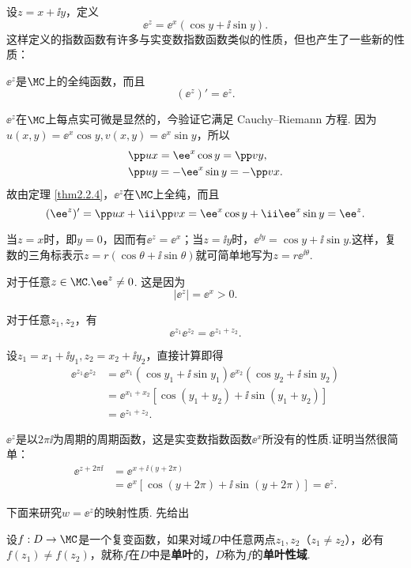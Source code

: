 设$z=x+\ii y$，定义
\[\ee^z=\ee^x(\cos y+\ii \sin y).\]
这样定义的指数函数有许多与实变数指数函数类似的性质，但也产生了一些新的性质：
\begin{eenum}\ccwd
\item $\ee^z$是$\MC$上的全纯函数，而且
  \[(\ee^z)'=\ee^z.\]

  $\ee^z$在$\MC$上每点实可微是显然的，今验证它满足 Cauchy--Riemann 方程. 因为$u(x,y)=\ee^x\cos y,v(x,y)=\ee^x\sin y$，所以
  \begin{align*}
  &\pp ux=\ee^x\cos y=\pp vy,\\
  &\pp uy=-\ee^x\sin y=-\pp vx.
  \end{align*}
故由定理 \ref{thm2.2.4}，$\ee^z$在$\MC$上全纯，而且
\[(\ee^z)'=\pp ux+\ii \pp vx=\ee^x\cos y+\ii \ee^x\sin y=\ee^z.\]

\item 当$z=x$时，即$y=0$，因而有$\ee^z=\ee^x$；当$z=\ii y$时，$\ee^{\ii y}=\cos y+\ii\sin y$.这样，复数的三角标表示$z=r(\cos\theta+\ii\sin\theta)$就可简单地写为$z=r\ee^{\ii\theta}$.

\item 对于任意$z\in \MC.\ee^z\ne0$. 这是因为
\[|\ee^z|=\ee^x>0.\]

\item 对于任意$z_1,z_2$，有
\[\ee^{z_1}\ee^{z_2}=\ee^{z_1+z_2}.\]

设$z_1=x_1+\ii y_1,z_2=x_2+\ii y_2$，直接计算即得
\begin{align*}
\ee^{z_1}\ee^{z_2}&=\ee^{x_1}(\cos y_1+\ii\sin y_1)\ee^{x_2}(\cos y_2+\ii \sin y_2)\\
&=\ee^{x_1+x_2}[\cos(y_1+y_2)+\ii\sin(y_1+y_2)]\\
&=\ee^{z_1+z_2}.
\end{align*}

\item $\ee^z$是以$2\pi\ii$为周期的周期函数，这是实变数指数函数$\ee^x$所没有的性质.证明当然很简单：
\begin{align*}
\ee^{z+2\pi\ii}&=\ee^{x+\ii(y+2\pi)}\\
&=\ee^x[\cos(y+2\pi)+\ii\sin(y+2\pi)]=\ee^z.
\end{align*}
\end{eenum}

下面来研究$w=\ee^z$的映射性质. 先给出
\begin{definition}\label{def2.4.1}
设$f:D\to\MC$是一个复变函数，如果对域$D$中任意两点$z_1,z_2$（$z_1\ne z_2$），必有$f(z_1)\ne f(z_2)$，就称$f$在$D$中是\textbf{单叶}的，$D$称为$f$的\textbf{单叶性域}.
\end{definition}

